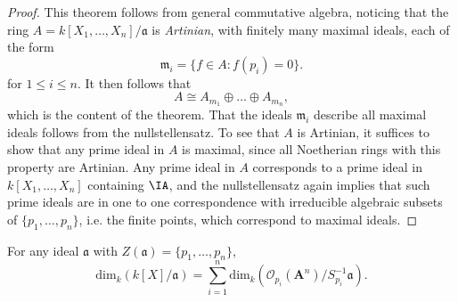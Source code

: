 \begin{proof}
    This theorem follows from general commutative algebra, noticing that the ring $A = k[X_1,\dots,X_n] / \mathfrak{a}$ is \emph{Artinian}, with finitely many maximal ideals, each of the form
    \[ \mathfrak{m}_i = \{ f \in A : f(p_i) = 0 \}. \]
    for $1 \leq i \leq n$. It then follows that
    \[ A \cong A_{m_1} \oplus \dots \oplus A_{m_n}, \]
    which is the content of the theorem. That the ideals $\mathfrak{m}_i$ describe all maximal ideals follows from the nullstellensatz. To see that $A$ is Artinian, it suffices to show that any prime ideal in $A$ is maximal, since all Noetherian rings with this property are Artinian. Any prime ideal in $A$ corresponds to a prime ideal in $k[X_1,\dots,X_n]$ containing $\IA$, and the  nullstellensatz again implies that such prime ideals are in one to one correspondence with irreducible algebraic subsets of $\{ p_1,\dots,p_n \}$, i.e. the finite points, which correspond to maximal ideals.
\end{proof}

\begin{corollary}
    For any ideal $\mathfrak{a}$ with $Z(\mathfrak{a}) = \{ p_1,\dots, p_n \}$,
    \[ \text{dim}_k(k[X]/\mathfrak{a}) = \sum_{i = 1}^n \text{dim}_k(\mathcal{O}_{p_i}(\mathbf{A}^n)/S_{p_i}^{-1} \mathfrak{a}). \]
\end{corollary}

